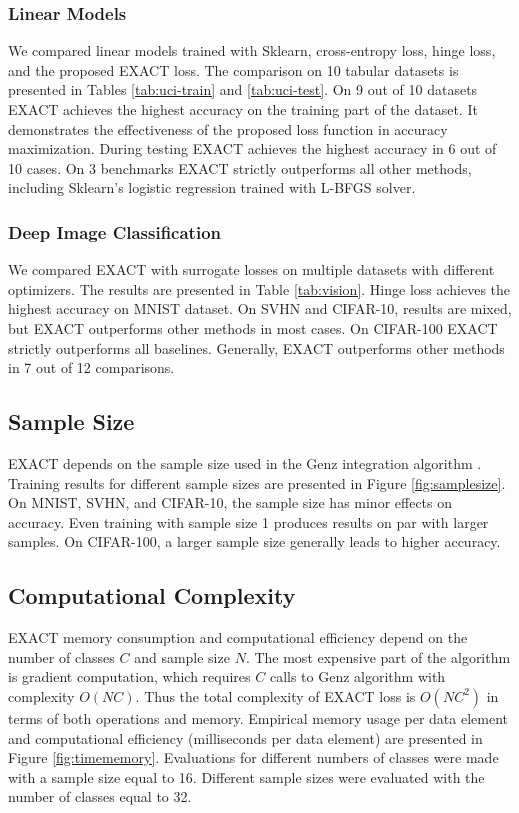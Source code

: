 \documentclass[nohyperref]{article}
\theoremstyle{plain}
\theoremstyle{definition}
\theoremstyle{remark}
\begin{document}
\subsubsection{Linear Models}
We compared linear models trained with Sklearn, cross-entropy loss, hinge loss, and the proposed EXACT loss. The comparison on 10 tabular datasets is presented in Tables \ref{tab:uci-train} and \ref{tab:uci-test}. On 9 out of 10 datasets EXACT achieves the highest accuracy on the training part of the dataset. It demonstrates the effectiveness of the proposed loss function in accuracy maximization. During testing \mbox{EXACT} achieves the highest accuracy in 6 out of 10 cases. On 3 benchmarks EXACT strictly outperforms all other methods, including Sklearn's logistic regression trained with L-BFGS solver. 

\subsubsection{Deep Image Classification}
We compared EXACT with surrogate losses on multiple datasets with different optimizers. The results are presented in Table \ref{tab:vision}. Hinge loss achieves the highest accuracy on MNIST dataset. On SVHN and CIFAR-10, results are mixed, but EXACT outperforms other methods in most cases. On CIFAR-100 EXACT strictly outperforms all baselines. Generally, EXACT outperforms other methods in 7 out of 12 comparisons.





\subsection{Sample Size}
EXACT depends on the sample size used in the Genz integration algorithm \cite{genz1992numerical}. Training results for different sample sizes are presented in Figure \ref{fig:samplesize}. On MNIST, SVHN, and CIFAR-10, the sample size has minor effects on accuracy. Even training with sample size 1 produces results on par with larger samples. On CIFAR-100, a larger sample size generally leads to higher accuracy.

\subsection{Computational Complexity}
EXACT memory consumption and computational efficiency depend on the number of classes $C$ and sample size $N$. The most expensive part of the algorithm is gradient computation, which requires $C$ calls to Genz algorithm with complexity $O(N C)$. Thus the total complexity of EXACT loss is $O(N C^2)$ in terms of both operations and memory. Empirical memory usage per data element and computational efficiency (milliseconds per data element) are presented in Figure \ref{fig:timememory}. Evaluations for different numbers of classes were made with a sample size equal to 16. Different sample sizes were evaluated with the number of classes equal to 32.
\end{document}
